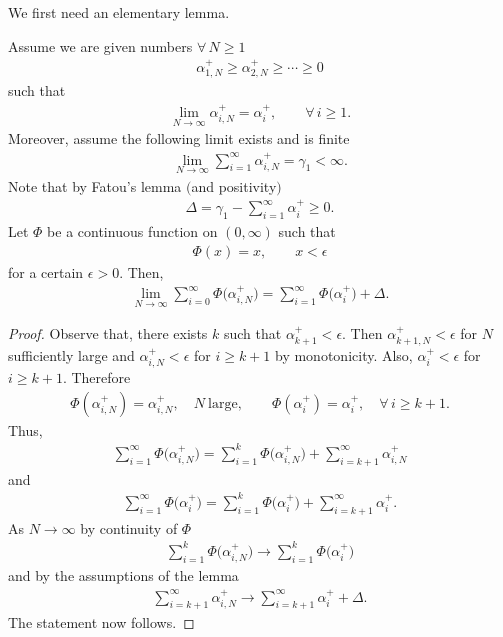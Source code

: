 We first need an elementary lemma.
\begin{Lemma}Assume we are given numbers $\forall\, N \ge 1$
\begin{gather*}
\alpha_{1,N}^+\ge \alpha_{2,N}^+\ge \cdots \ge 0
\end{gather*}
such that
\begin{gather*}
\lim_{N \to \infty}\alpha_{i,N}^+=\alpha_i^+, \qquad \forall\, i\ge 1.
\end{gather*}
Moreover, assume the following limit exists and is finite
\begin{gather*}
\lim_{N\to \infty} \sum_{i=1}^{\infty}\alpha_{i,N}^+=\gamma_1<\infty.
\end{gather*}
Note that by Fatou's lemma $($and positivity$)$
\begin{gather*}
\Delta=\gamma_1-\sum_{i=1}^{\infty}\alpha_i^+\ge 0.
\end{gather*}
Let $\Phi$ be a continuous function on $(0,\infty)$ such that
\begin{gather*}
\Phi(x)=x, \qquad x<\epsilon
\end{gather*}
for a certain $\epsilon>0$. Then,
\begin{gather*}
\lim_{N \to \infty}\sum_{i=0}^{\infty} \Phi\big(\alpha_{i,N}^+\big)=\sum_{i=1}^{\infty} \Phi\big(\alpha_i^+\big)+\Delta.
\end{gather*}
\end{Lemma}

\begin{proof}Observe that, there exists $k$ such that $\alpha_{k+1}^{+}<\epsilon$. Then $\alpha_{k+1,N}^+<\epsilon$ for $N$ sufficiently large and $\alpha_{i,N}^+<\epsilon$ for $i\ge k+1$ by monotonicity. Also, $\alpha_i^+<\epsilon$ for $i\ge k+1$. Therefore
\begin{gather*}
\Phi(\alpha_{i,N}^+)=\alpha_{i,N}^+, \quad N \ \text{large},\qquad \Phi(\alpha_{i}^+)=\alpha_{i}^+, \quad \forall\, i \ge k+1.
\end{gather*}
Thus,
\begin{gather*}
\sum_{i=1}^{\infty}\Phi\big(\alpha_{i,N}^+\big)=\sum_{i=1}^{k}\Phi\big(\alpha_{i,N}^+\big)+\sum_{i=k+1}^{\infty}\alpha_{i,N}^+
\end{gather*}
and
\begin{gather*}
\sum_{i=1}^{\infty}\Phi\big(\alpha_{i}^+\big)=\sum_{i=1}^{k}\Phi\big(\alpha_{i}^+\big)+\sum_{i=k+1}^{\infty}\alpha_{i}^+.
\end{gather*}
As $N \to \infty$ by continuity of $\Phi$
\begin{gather*}
\sum_{i=1}^{k}\Phi\big(\alpha_{i,N}^+\big) \to \sum_{i=1}^{k}\Phi\big(\alpha_{i}^+\big)
\end{gather*}
and by the assumptions of the lemma
\begin{gather*}
\sum_{i=k+1}^{\infty}\alpha_{i,N}^+\to \sum_{i=k+1}^{\infty}\alpha_{i}^++\Delta.
\end{gather*}
The statement now follows.
\end{proof}

